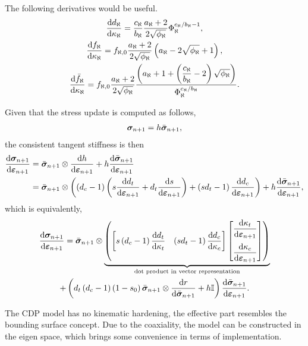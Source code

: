 The following derivatives would be useful.
\begin{gather}
\dfrac{\mathrm{d}d_\aleph}{\mathrm{d}\kappa_\aleph}=\dfrac{c_\aleph}{b_\aleph}\dfrac{a_\aleph+2}{2\sqrt{\phi_\aleph}}\Phi_\aleph^{c_\aleph/b_\aleph-1},\\
\dfrac{\mathrm{d}f_\aleph}{\mathrm{d}\kappa_\aleph}=f_{\aleph,0}\dfrac{a_\aleph+2}{2\sqrt{\phi_\aleph}}\left(a_\aleph-2\sqrt{\phi_\aleph}+1\right),\\
\dfrac{\mathrm{d}\bar{f}_\aleph}{\mathrm{d}\kappa_\aleph}=f_{\aleph,0}\dfrac{a_\aleph+2}{2\sqrt{\phi_\aleph}}\dfrac{\left(a_\aleph+1+\left(\dfrac{c_\aleph}{b_\aleph}-2\right)\sqrt{\phi_\aleph}\right)}{\Phi_\aleph^{c_\aleph/b_\aleph}}.
\end{gather}

Given that the stress update is computed as follows,
\begin{gather}
\bm{\sigma}_{n+1}=h\bar{\bm{\sigma}}_{n+1},
\end{gather}
the consistent tangent stiffness is then
\begin{gather}
\begin{split}
\dfrac{\mathrm{d}\bm{\sigma}_{n+1}}{\mathrm{d}\bm{\varepsilon}_{n+1}}&=\bar{\bm{\sigma}}_{n+1}\otimes\dfrac{\mathrm{d}h}{\mathrm{d}\bm{\varepsilon}_{n+1}}+h\dfrac{\mathrm{d}\bar{\bm{\sigma}}_{n+1}}{\mathrm{d}\bm{\varepsilon}_{n+1}}\\
&=\bar{\bm{\sigma}}_{n+1}\otimes\left(\left(d_c-1\right)\left(s\dfrac{\mathrm{d}d_t}{\mathrm{d}\bm{\varepsilon}_{n+1}}+d_t\dfrac{\mathrm{d}s}{\mathrm{d}\bm{\varepsilon}_{n+1}}\right)+\left(sd_t-1\right)\dfrac{\mathrm{d}d_c}{\mathrm{d}\bm{\varepsilon}_{n+1}}\right)+h\dfrac{\mathrm{d}\bar{\bm{\sigma}}_{n+1}}{\mathrm{d}\bm{\varepsilon}_{n+1}},
\end{split}
\end{gather}
which is equivalently,
\begin{multline}\label{eq:cdp_pd}
\dfrac{\mathrm{d}\bm{\sigma}_{n+1}}{\mathrm{d}\bm{\varepsilon}_{n+1}}=\bar{\bm{\sigma}}_{n+1}\otimes\underbrace{\left(\begin{bmatrix}
s\left(d_c-1\right)\dfrac{\mathrm{d}d_t}{\mathrm{d}\kappa_t}&
\left(sd_t-1\right)\dfrac{\mathrm{d}d_c}{\mathrm{d}\kappa_c}
\end{bmatrix}
\begin{bmatrix}
\dfrac{\mathrm{d}\kappa_t}{\mathrm{d}\bm{\varepsilon}_{n+1}}\\[4mm]
\dfrac{\mathrm{d}\kappa_c}{\mathrm{d}\bm{\varepsilon}_{n+1}}
\end{bmatrix}\right)}_\text{dot product in vector representation}\\+\left(d_t\left(d_c-1\right)\left(1-s_0\right)\bar{\bm{\sigma}}_{n+1}\otimes\dfrac{\mathrm{d}r}{\mathrm{d}\bar{\bm{\sigma}}_{n+1}}+h\mathbb{I}\right)\dfrac{\mathrm{d}\bar{\bm{\sigma}}_{n+1}}{\mathrm{d}\bm{\varepsilon}_{n+1}}.
\end{multline}

The CDP model has no kinematic hardening, the effective part resembles the bounding surface concept. Due to the coaxiality, the model can be constructed in the eigen space, which brings some convenience in terms of implementation.
